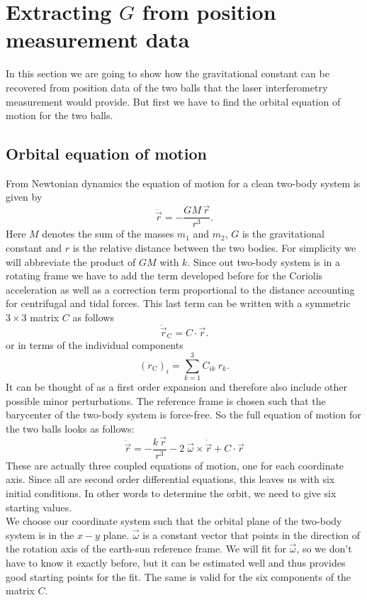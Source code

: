 \documentclass[prb,preprint]{revtex4-1}
\begin{document}
\section{Extracting $G$ from position measurement data}

In this section we are going to show how the gravitational constant can be recovered from position data of the two balls that the laser interferometry measurement would provide.
But first we have to find the orbital equation of motion for the two balls.\\

\subsection{Orbital equation of motion}
From Newtonian dynamics the equation of motion for a clean two-body system is given by 
\begin{equation}
\label{eq:eomeasy}
\ddot{\vec{r}} = - \frac{G M\, \vec{r}}{r^3}.
\end{equation}
Here $M$ denotes the sum of the masses $m_1$ and $m_2$, $G$ is the gravitational constant and $r$ is the relative distance between the two bodies. For simplicity we will abbreviate the product of $GM$ with $k$.
Since out two-body system is in a rotating frame we have to add the term developed before for the Coriolis acceleration as well as a correction term proportional to the distance accounting for centrifugal and tidal forces. This last term can be written with a
symmetric $3 \times 3$ matrix $C$ as follows  
\begin{equation}
\label{eq:tidal}
\ddot{\vec{r}}_{\mathrm{C}} = C \cdot \vec{r}.
\end{equation}
or in terms of the individual components 
\begin{equation}
\label{eq:tidacom}
\left(\ddot{r}_\mathrm{C}\right)_i = \sum_{k=1}^{3} C_{ik} \: r_k.
\end{equation}
It can be thought of as a first order expansion and therefore also include other possible minor perturbations. The reference frame is chosen such that the barycenter of the two-body system is force-free.
So the full equation of motion for the two balls looks as follows:
\begin{equation}
\label{eq:eom}
\ddot{\vec{r}} = - \frac{k\,\vec{r}}{r^3} - 2 \; \vec{\omega} \times \dot{\vec{r}} + C \cdot \vec{r}
\end{equation}
These are actually three coupled equations of motion, one for each coordinate axis. Since all are second order differential equations, this leaves us with six initial conditions. In other words to determine the orbit, we need to give six starting values.\\
We choose our coordinate system such that the orbital plane of the two-body system is in the $x-y$ plane. $\vec{\omega}$ is a constant vector that points in the direction of the rotation axis of the earth-sun reference frame. We will fit for $\vec{\omega}$, so we don't have to know it exactly before, but it can be estimated well and thus provides good starting points for the fit. The same is valid for the six components of the matrix $C$.\\
\end{document}
